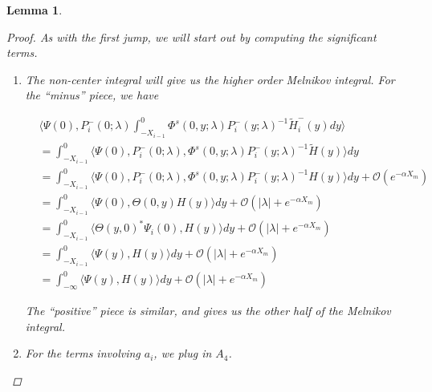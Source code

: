 \documentclass[12pt]{article}
\newtheorem{lemma}{Lemma}
\begin{document}
\begin{lemma}
\begin{proof}
As with the first jump, we will start out by computing the significant terms.

\begin{enumerate}
\item The non-center integral will give us the higher order Melnikov integral. For the ``minus'' piece, we have

\begin{align*}
&\langle \Psi(0), P_i^-(0; \lambda) \int_{-X_{i-1}}^0 \Phi^s(0, y; \lambda) P_i^-(y; \lambda)^{-1} \tilde{H}_i^-(y) dy \rangle \\
&= \int_{-X_{i-1}}^0 \langle \Psi(0), P_i^-(0; \lambda), \Phi^s(0, y; \lambda) P_i^-(y; \lambda)^{-1} \tilde{H}(y) \rangle dy \\
&= \int_{-X_{i-1}}^0 \langle \Psi(0), P_i^-(0; \lambda), \Phi^s(0, y; \lambda) P_i^-(y; \lambda)^{-1} H(y) \rangle dy + \mathcal{O}({e^{-\alpha X_m}})\\
&= \int_{-X_{i-1}}^0 \langle \Psi(0), \Theta(0, y) H(y) \rangle dy + \mathcal{O}(|\lambda| + {e^{-\alpha X_m}})\\
&= \int_{-X_{i-1}}^0 \langle \Theta(y, 0)^* \Psi_i(0), H(y) \rangle dy + \mathcal{O}(|\lambda| + {e^{-\alpha X_m}})\\
&= \int_{-X_{i-1}}^0 \langle \Psi(y), H(y) \rangle dy + \mathcal{O}(|\lambda| + {e^{-\alpha X_m}})\\
&= \int_{-\infty}^0 \langle \Psi(y), H(y) \rangle dy + \mathcal{O}(|\lambda| + {e^{-\alpha X_m}})
\end{align*}

The ``positive'' piece is similar, and gives us the other half of the Melnikov integral.

\item For the terms involving $a_i$, we plug in $A_4$.


\end{enumerate}
\end{proof}
\end{lemma}
\end{document}
